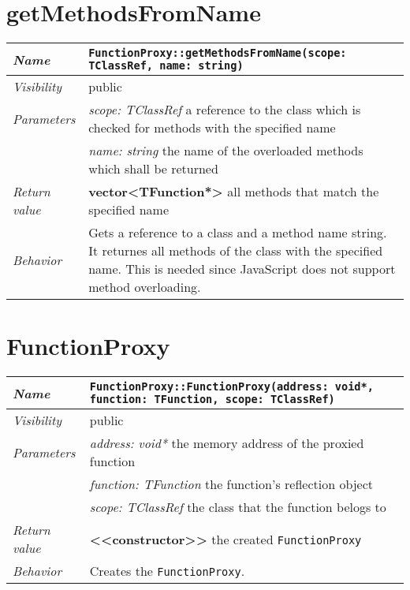 \section{getMethodsFromName}
\begin{longtable}{p{3cm} @{\hskip 1cm} p{12cm}}
	\hline

	\textit{Name} & \texttt{FunctionProxy::getMethodsFromName(scope: TClassRef, name: string)}\\
	\hline

	\textit{Visibility} & public\\
	\hline

	\textit{Parameters} & \textit{scope: TClassRef} a reference to the class which is checked for methods with the specified name\\
		& \textit{name: string} the name of the overloaded methods which shall be returned\\
	\hline

	\textit{Return value} & \textbf{vector<TFunction*>} all methods that match the specified name\\
	\hline

	\textit{Behavior} & Gets a reference to a class and a method name string. It returnes all methods of the class with the specified name. This is needed since JavaScript does not support method overloading.\\
	\hline

\end{longtable} \pagebreak

\section{FunctionProxy}
\begin{longtable}{p{3cm} @{\hskip 1cm} p{12cm}}
	\hline

	\textit{Name} & \texttt{FunctionProxy::FunctionProxy(address: void*, function: TFunction, scope: TClassRef)}\\
	\hline

	\textit{Visibility} & public\\
	\hline

	\textit{Parameters} & \textit{address: void*} the memory address of the proxied function\\
		& \textit{function: TFunction} the function's reflection object\\
		& \textit{scope: TClassRef} the class that the function belogs to\\
	\hline

	\textit{Return value} & \textbf{ <<constructor>>} the created \texttt{FunctionProxy}\\
	\hline

	\textit{Behavior} & Creates the \texttt{FunctionProxy}.\\
	\hline

\end{longtable} \pagebreak


